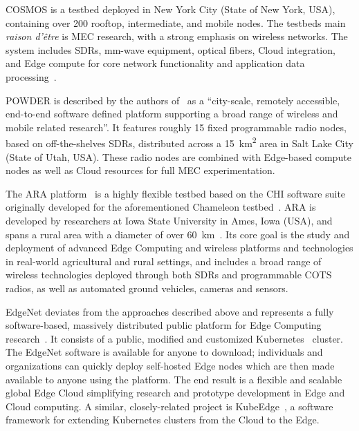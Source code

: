 \gls{COSMOS} is a testbed deployed in New York City (State of New York, \gls{USA}), containing over \num{200} rooftop, intermediate, and mobile nodes.
The testbeds main \emph{raison d'être} is \gls{MEC} research, with a strong emphasis on wireless networks.
The system includes \glspl{SDR}, \si{\milli\meter}-wave equipment, optical fibers, Cloud integration, and Edge compute for core network functionality and application data processing~\cite{yu2019cosmos,raychaudhuri2020challenge}.

\gls{POWDER} is described by the authors of~\cite{breen2020powder} as a ``city-scale, remotely accessible, end-to-end software defined platform supporting a broad range of wireless and mobile related research''.
It features roughly \num{15} fixed programmable radio nodes, based on off-the-shelves \glspl{SDR}, distributed across a \SI{15}{\kilo\meter\squared} area in Salt Lake City (State of Utah, \gls{USA}).
These radio nodes are combined with Edge-based compute nodes as well as Cloud resources for full \gls{MEC} experimentation.

The \gls{ARA} platform~\cite{zhang2022ara} is a highly flexible testbed based on the \gls{CHI} software suite originally developed for the aforementioned Chameleon testbed~\cite{keahey2020lessons}.
\gls{ARA} is developed by researchers at Iowa State University in Ames, Iowa (\gls{USA}), and spans a rural area with a diameter of over \SI{60}{\kilo\meter}~\cite{zhang2022ara}.
Its core goal is the study and deployment of advanced Edge Computing and wireless platforms and technologies in real-world agricultural and rural settings, and includes a broad range of wireless technologies deployed through both \glspl{SDR} and programmable \gls{COTS} radios, as well as automated ground vehicles, cameras and sensors.

EdgeNet deviates from the approaches described above and represents a fully software-based, massively distributed public platform for Edge Computing research~\cite{cappos2018edgenet,senel2021edgenet1,senel2021edgenet2}.
It consists of a public, modified and customized Kubernetes~\cite{kubernetes} cluster.
The EdgeNet software is available for anyone to download;
individuals and organizations can quickly deploy self-hosted Edge nodes which are then made available to anyone using the platform.
The end result is a flexible and scalable global Edge Cloud simplifying research and prototype development in Edge and Cloud computing.
A similar, closely-related project is KubeEdge~\cite{xiong2018extend}, a software framework for extending Kubernetes clusters from the Cloud to the Edge.

